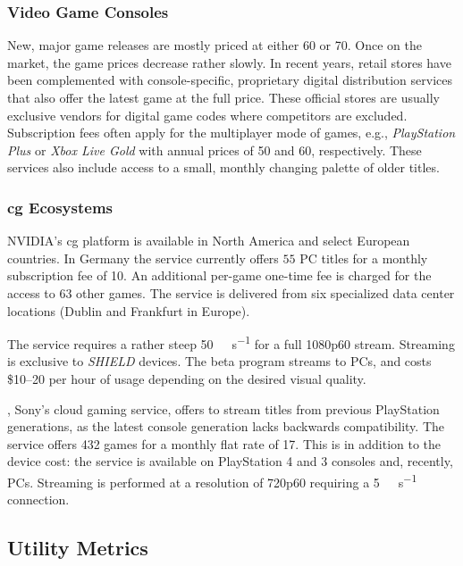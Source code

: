 \subsubsection{Video Game Consoles}

New, major game releases are mostly priced at either
\SI{60}[\EUR]{} or \SI{70}[\EUR]{}. Once on the market, the
game prices decrease rather slowly. In recent years, retail stores have
been complemented with console-specific, proprietary digital
distribution services that also offer the latest game at the full price.
These official stores are usually exclusive vendors for digital game
codes where competitors are excluded.
Subscription fees often apply for the multiplayer mode of games, e.g.,
\textit{PlayStation Plus} or \textit{Xbox Live Gold} with annual prices
of \SI{50}[\EUR]{} and \SI{60}[\EUR]{}, respectively. These
services also include access to a small, monthly changing palette of
older titles.


\subsubsection{\Gls{cg} Ecosystems}

NVIDIA's \gls{cg} platform \gfnow
is available in North America and select European countries.
In Germany the service currently offers $55$ PC titles
for a monthly subscription fee of \SI{10}[\EUR]{}. An additional
per-game one-time fee
is charged for the access to $63$ other games.
The service is delivered from six
specialized data center locations (Dublin and Frankfurt in Europe).

The service requires a rather steep \SI{50}{\mega\bit\per\second} for a full 1080p60 stream.
Streaming is exclusive to \textit{SHIELD} devices.
The \gfnowpc beta program streams to \glspl{PC}, and costs
\$\SIrange{10}{20}{} per hour of usage depending on the desired
visual quality.

\psnow, Sony's cloud gaming service, offers to stream titles from previous
PlayStation generations, as the latest console generation lacks
backwards compatibility.
The service offers 432 games for a monthly flat rate of
\SI{17}[\EUR]{}.
This is in addition to
the device cost: the service is available on PlayStation 4 and 3
consoles and, recently, \glspl{PC}.
Streaming is performed at a resolution of
720p60 requiring a \SI{5}{\mega\bit\per\second}
connection.

\subsection{Utility Metrics}

